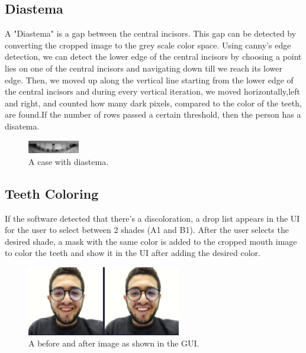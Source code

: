\documentclass[conference,twocolumn]{IEEEtran}
\begin{document}
\subsection{Diastema}
A "Diastema" is a gap between the central incisors. 
This gap can be detected by converting the cropped image to the grey scale color space. Using canny's edge detection, we can detect the lower edge of the central incisors by choosing a point lies on one of the central incisors and navigating down till we reach its lower edge. 
Then, we moved up along the vertical line starting from
the lower edge of the central incisors and during every vertical iteration, we moved horizontally,left and right, and counted how many dark pixels, compared to the color of the teeth, are found.If the number of rows passed a certain threshold, then the person has a disatema.
\begin{figure}[H]
    \centering
    \includegraphics[width=0.2\textwidth]{diastemapng.png}
    \caption{A case with diastema.}
    \label{fig:my_label}
\end{figure}
\subsection{Teeth Coloring}
If the software detected that there's a discoloration, a drop list appears in the UI for the user to select between 2 shades (A1 and B1).
After the user selects the desired shade, a mask with the same color is added to the cropped mouth image to color the teeth and show it in the UI after adding the desired color. 
\begin{figure}[H]
    \centering
    \includegraphics[width=0.6\textwidth]{coloring.png}
    \caption{A before and after image as shown in the GUI.}
    \label{fig:my_label}
\end{figure}
\end{document}
